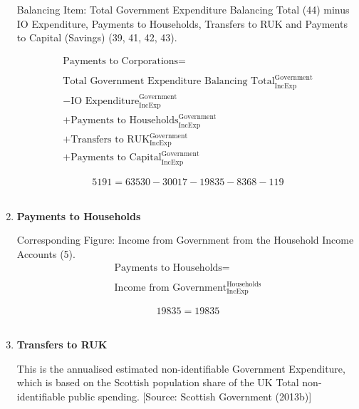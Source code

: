 \begin{enumerate}
Balancing Item:  Total Government Expenditure Balancing Total (44) minus IO Expenditure, Payments to Households, Transfers to RUK and Payments to Capital (Savings) (39, 41, 42, 43).

\begin{equation}
\begin{split}
\text{Payments to Corporations} =  \\ \\
\text{Total Government Expenditure Balancing Total}^\text{Government}_\text{IncExp}\\
-\text{IO Expenditure}^\text{Government}_\text{IncExp}\\
+\text{Payments to Households}^\text{Government}_\text{IncExp}\\
+\text{Transfers to RUK}^\text{Government}_\text{IncExp}\\
+\text{Payments to Capital}^\text{Government}_\text{IncExp}
\end{split} \label{eq:2.5.43}
\end{equation}

\begin{equation} \nonumber
5191 = 63530-30017-19835-8368-119
\end{equation}\\


\item \textbf {Payments to Households}

Corresponding Figure: Income from Government from the Household Income Accounts (5).\\

\begin{equation}
\begin{split}
\text{Payments to Households} =  \\ \\
\text{Income from Government}^\text{Households}_\text{IncExp}
\end{split} \label{eq:2.5.44}
\end{equation}

\begin{equation} \nonumber
19835 = 19835
\end{equation}\\


\item \textbf {Transfers to RUK}

This is the annualised estimated non-identifiable Government Expenditure, which is based on the Scottish population share of the UK Total non-identifiable public spending. [Source: Scottish Government (2013b)]


\end{enumerate}

